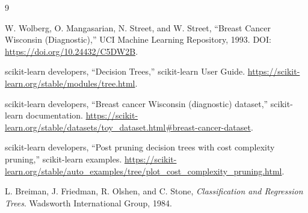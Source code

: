 \clearpage
{}
{}
\begin{thebibliography}{9}

W. Wolberg, O. Mangasarian, N. Street, and W. Street,
``Breast Cancer Wisconsin (Diagnostic),''
UCI Machine Learning Repository, 1993.
DOI: \url{https://doi.org/10.24432/C5DW2B}.

scikit-learn developers,
``Decision Trees,'' scikit-learn User Guide.
\url{https://scikit-learn.org/stable/modules/tree.html}.

scikit-learn developers,
``Breast cancer Wisconsin (diagnostic) dataset,'' scikit-learn documentation.
\url{https://scikit-learn.org/stable/datasets/toy_dataset.html#breast-cancer-dataset}.

scikit-learn developers,
``Post pruning decision trees with cost complexity pruning,'' scikit-learn examples.
\url{https://scikit-learn.org/stable/auto_examples/tree/plot_cost_complexity_pruning.html}.

L. Breiman, J. Friedman, R. Olshen, and C. Stone,
\textit{Classification and Regression Trees}.
Wadsworth International Group, 1984.

\end{thebibliography}
